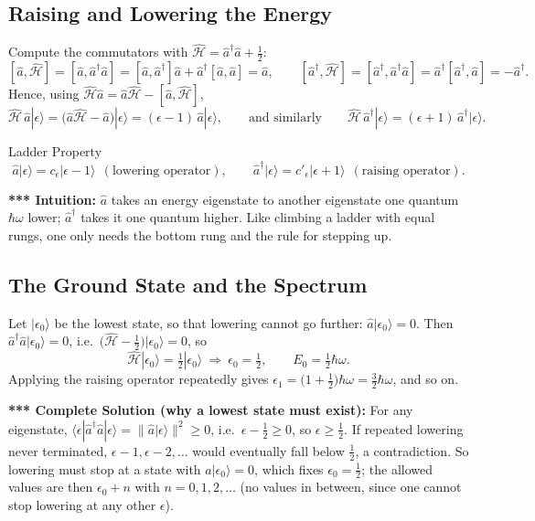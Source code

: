 \documentclass[11pt,a4paper]{article}
\begin{document}
\subsection{Raising and Lowering the Energy}
Compute the commutators with $\hat{\mathcal H}=\hat a^\dagger\hat a+\frac12$:
\[
[\hat a,\hat{\mathcal H}]=[\hat a,\hat a^\dagger\hat a]=[\hat a,\hat a^\dagger]\hat a+\hat a^\dagger[\hat a,\hat a]=\hat a,\qquad
[\hat a^\dagger,\hat{\mathcal H}]=[\hat a^\dagger,\hat a^\dagger\hat a]=\hat a^\dagger[\hat a^\dagger,\hat a]=-\hat a^\dagger .
\]
Hence, using $\hat{\mathcal H}\hat a=\hat a\hat{\mathcal H}-[\hat a,\hat{\mathcal H}]$,
\[
\hat{\mathcal H}\,\hat a|\epsilon\rangle=\big(\hat a\hat{\mathcal H}-\hat a\big)|\epsilon\rangle=(\epsilon-1)\,\hat a|\epsilon\rangle,
\qquad\text{and similarly}\qquad
\hat{\mathcal H}\,\hat a^\dagger|\epsilon\rangle=(\epsilon+1)\,\hat a^\dagger|\epsilon\rangle .
\]
\begin{thm}{Ladder Property}
\[
\hat a|\epsilon\rangle=c_\epsilon|\epsilon-1\rangle\ \ (\text{lowering operator}),\qquad
\hat a^\dagger|\epsilon\rangle=c'_\epsilon|\epsilon+1\rangle\ \ (\text{raising operator}).
\]
\end{thm}
\textbf{*** Intuition:} $\hat a$ takes an energy eigenstate to another eigenstate one quantum $\hbar\omega$ lower; $\hat a^\dagger$ takes it one quantum higher. Like climbing a ladder with equal rungs, one only needs the bottom rung and the rule for stepping up.

\subsection{The Ground State and the Spectrum}
Let $|\epsilon_0\rangle$ be the lowest state, so that lowering cannot go further: $\hat a|\epsilon_0\rangle=0$. Then $\hat a^\dagger\hat a|\epsilon_0\rangle=0$, i.e.\ $\big(\hat{\mathcal H}-\frac12\big)|\epsilon_0\rangle=0$, so
\[
\hat{\mathcal H}|\epsilon_0\rangle=\tfrac12|\epsilon_0\rangle\ \Longrightarrow\ \epsilon_0=\tfrac12,\qquad E_0=\tfrac12\hbar\omega .
\]
Applying the raising operator repeatedly gives $\epsilon_1=\big(1+\frac12\big)\hbar\omega=\frac32\hbar\omega$, and so on.

\textbf{*** Complete Solution (why a lowest state must exist):} For any eigenstate, $\langle\epsilon|\hat a^\dagger\hat a|\epsilon\rangle=\|\hat a|\epsilon\rangle\|^2\ge0$, i.e.\ $\epsilon-\frac12\ge0$, so $\epsilon\ge\frac12$. If repeated lowering never terminated, $\epsilon-1,\epsilon-2,\dots$ would eventually fall below $\frac12$, a contradiction. So lowering must stop at a state with $\hat a|\epsilon_0\rangle=0$, which fixes $\epsilon_0=\frac12$; the allowed values are then $\epsilon_0+n$ with $n=0,1,2,\dots$ (no values in between, since one cannot stop lowering at any other $\epsilon$).
\end{document}
